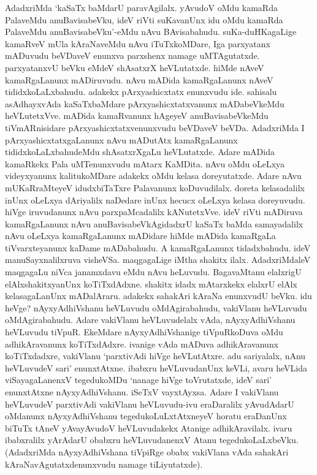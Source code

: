 AdadxriMda `kaSaTx baMdarU paravAgilalx. yAvudoV oMdu kamaRda PalaveMdu anuBavisabeVku, ideV riVti suKavanUnx idu oMdu kamaRda PalaveMdu anuBavisabeVku'-eMdu nAvu BAvisabahudu. suKa-duHKagaLige kamaRveV mUla kAraNaveMdu nAvu iTuTxkoMDare, Iga parxyatanx mADuvudu beVDaveV enunxva parxshenx namage uMTAgutatxde. parxyatanxvU beVku eMdeV shAsatxrX heVLutatxde. hiMde nAveV kamaRgaLanunx mADiruvudu. nAvu mADida kamaRgaLanunx nAveV tididxkoLaLxbahudu. adakekx pArxyashicxtatx enunxvudu ide. sahisalu asAdhayxvAda kaSaTxbaMdare pArxyashicxtatxvanunx mADabeVkeMdu heVLutetxVve. mADida kamaRvanunx hAgeyeV anuBavisabeVkeMdu tiVmARnisidare pArxyashicxtatxvenunxvudu beVDaveV beVDa. AdadxriMda I pArxyashicxtatxgaLanunx nAvu mADutAtx kamaRgaLanunx tididxkoLaLxbahudeMdu shAsatxrXgaLu heVLutatxde. Adare mADida kamaRkekx Pala uMTenunxvudu mAtarx KaMDita. nAvu oMdu oLeLxya videyxyanunx kalitukoMDare adakekx oMdu kelasa doreyutatxde. Adare nAvu mUKaRraMteyeV idudxbiTaTxre Palavanunx koDuvudilalx. doreta kelasadalilx inUnx oLeLxya dAriyalilx naDedare inUnx hecucx oLeLxya kelasa doreyuvudu. hiVge iruvudanunx nAvu parxpaMcadalilx kANutetxVve. ideV riVti mADiruva kamaRgaLanunx nAvu anuBavisabeVkAgidadxrU kaSaTx baMda samayadalilx nAvu oLeLxya kamaRgaLanunx mADidare hiMde mADida kamaRgaLa tiVvarxteyanunx kaDame mADabahudu. A kamaRgaLanunx tidadxbahudu. ideV manuSayxnalilxruva visheVSa. maqgagaLige iMtha shakitx ilalx. AdadxriMdaleV maqgagaLu niVca janamxdavu eMdu nAvu heLuvudu. BagavaMtanu elalxrigU elAlxshakitxyanUnx koTiTxdAdxne. shakitx idadx mAtarxkekx elalxrU elAlx kelasagaLanUnx mADalAraru. adakekx sahakAri kAraNa enunxvudU beVku. idu heVge? nAyxyAdhiVshanu heVLuvudu oMdAgirabahudu, vakiVlanu heVLuvudu oMdAgirabahudu. Adare vakiVlanu heVLuvudelalx vAda, nAyxyAdhiVshanu heVLuvudu tiVpuR. EkeMdare nAyxyAdhiVshanige tiVpuRkoDuva oMdu adhikAravanunx koTiTxdAdxre. ivanige vAda mADuva adhikAravanunx koTiTxdadxre, vakiVlanu `parxtivAdi hiVge heVLutAtxre. adu sariyalalx, nAnu heVLuvudeV sari' enunxtAtxne. ibabxru heVLuvudanUnx keVLi, avaru heVLida viSayagaLanenxV tegedukoMDu `nanage hiVge toVrutatxde, ideV sari' enunxtAtxne nAyxyAdhiVshanu. iSeTxV vayxtAyxsa. Adare I vakiVlanu heVLuvudeV parxtivAdi vakiVlanu heVLuvudu-ivu eraDaralilx yAvudAdarU oMdanunx nAyxyAdhiVshanu tegedukoLuLxtAtxneyeV horatu eraDanUnx biTuTx tAneV yAvayAvudoV heVLuvudakekx Atanige adhikAravilalx. ivaru ibabxralilx yArAdarU obabxru heVLuvudanenxV Atanu tegedukoLaLxbeVku. (AdadxriMda nAyxyAdhiVshana tiVpiRge obabx vakiVlana vAda sahakAri kAraNavAgutatxdenunxvudu namage tiLiyutatxde). 

